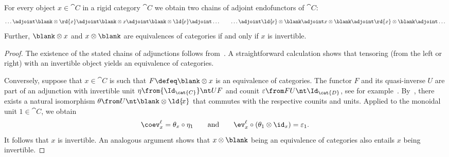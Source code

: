 \begin{proposition}\label{prop: rigidity_yields_adjoints}
  For every object \(x \in \cat{C}\) in a rigid category \(\cat{C}\) we obtain two chains of adjoint endofunctors of \(\cat{C}\):
  \begin{align*}
    \dots \adjoint \blank \otimes \rd{x} \adjoint \blank \otimes x \adjoint \blank \otimes \ld{\!{}x} \adjoint \dots
    \qquad
    \dots \adjoint \ld{\!{}x} \otimes \blank \adjoint x \otimes \blank \adjoint \rd{x} \otimes \blank \adjoint \dots
  \end{align*}
  Further, \(\blank \otimes x\) and \(x \otimes \blank\) are equivalences of categories if and only if \(x\) is invertible.
\end{proposition}
\begin{proof}
  The existence of the stated chains of adjunctions follows from~\cite[Proposition~2.10.8]{Etingof2015}.
  A straightforward calculation shows that tensoring (from the left or right)
  with an invertible object yields an equivalence of categories.

  Conversely, suppose that \(x \in \cat{C}\) is such that \(F \defeq \blank \otimes x\) is an equivalence of categories.
  The functor \(F\) and its quasi-inverse \(U\) are part of an adjunction
  with invertible unit \(\eta \from {\Id_{\cat{C}}} \nt UF\)
  and counit \(\varepsilon \from FU \nt \Id_{\cat{D}}\),
  see for example~\cite[Proposition~4.4.5]{category-theory-in-context_riehl}.
  By~\cite[Proposition~4.4.1]{category-theory-in-context_riehl}, there exists a natural isomorphism \(\theta \from U \nt \blank \otimes \ld{\!{}x}\)
  that commutes with the respective counits and units.
  Applied to the monoidal unit \(1 \in \cat{C}\), we obtain
  \[
    \coev_{x}^{\ell} = \theta_x \circ \eta_1 \qquad \text{and} \qquad \ev_x^{\ell} \circ (\theta_1 \otimes \id_x) = \varepsilon_1 .
  \]
  It follows that \(x\) is invertible.
  An analogous argument shows that \(x \otimes \blank \) being an equivalence of categories also entails \(x\) being invertible.
\end{proof}

